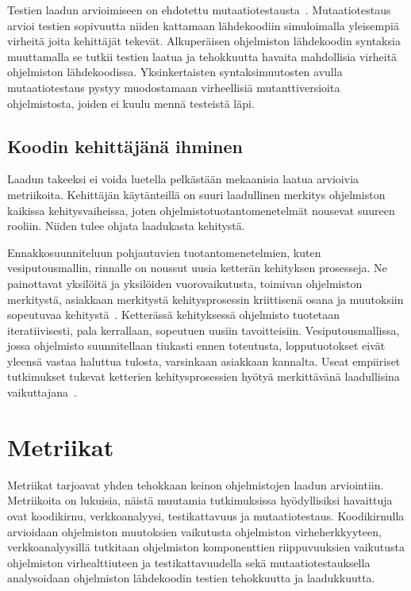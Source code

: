 \documentclass[finnish]{../tktltiki2}
\theoremstyle{definition}
\theoremstyle{remark}
\begin{document}
    Testien laadun arvioimiseen on ehdotettu mutaatiotestausta~\cite{YH11}. Mutaatiotestaus arvioi testien sopivuutta 
niiden kattamaan lähdekoodiin simuloimalla yleisempiä virheitä joita kehittäjät tekevät. Alkuperäisen ohjelmiston 
lähdekoodin syntaksia muuttamalla se tutkii testien laatua ja tehokkuutta havaita mahdollisia virheitä ohjelmiston 
lähdekoodissa. Yksinkertaisten syntaksimuutosten avulla mutaatiotestaus pystyy muodostamaan virheellisiä 
mutanttiversioita ohjelmistosta, joiden ei kuulu mennä testeistä läpi.

\subsection{Koodin kehittäjänä ihminen}

Laadun takeeksi ei voida luetella pelkästään mekaanisia laatua arvioivia metriikoita. Kehittäjän käytänteillä on suuri 
laadullinen merkitys ohjelmiston kaikissa kehitysvaiheissa, joten ohjelmistotuotantomenetelmät nousevat suureen rooliin. 
Niiden tulee ohjata laadukasta kehitystä.

    Ennakkosuunniteluun pohjautuvien tuotantomenetelmien, kuten vesiputousmallin, rinnalle on noussut uusia ketterän 
kehityksen prosesseja. Ne painottavat yksilöitä ja yksilöiden vuorovaikutusta, toimivan ohjelmiston merkitystä, 
asiakkaan merkitystä kehitysprosessin kriittisenä osana ja muutoksiin sopeutuvaa kehitystä~\cite{BBB01}. Ketterässä 
kehityksessä ohjelmisto tuotetaan iteratiivisesti, pala kerrallaan, sopeutuen uusiin tavoitteisiin. Vesiputousmallissa, 
jossa ohjelmisto suunnitellaan tiukasti ennen toteutusta, lopputuotokset eivät yleensä vastaa haluttua tulosta, 
varsinkaan asiakkaan kannalta. Useat empiiriset tutkimukset tukevat ketterien kehitysprosessien hyötyä merkittävänä 
laadullisina vaikuttajana~\cite{SS10}.

\section{Metriikat}

Metriikat tarjoavat yhden tehokkaan keinon ohjelmistojen laadun arviointiin. Metriikoita on lukuisia, näistä muutamia 
tutkimuksissa hyödyllisiksi havaittuja ovat koodikirnu, verkkoanalyysi, testikattavuus ja mutaatiotestaus. Koodikirnulla 
arvioidaan ohjelmiston muutoksien vaikutusta ohjelmiston virheherkkyyteen, verkkoanalyysillä tutkitaan ohjelmiston 
komponenttien riippuvuuksien vaikutusta ohjelmiston virhealttiuteen ja testikattavuudella sekä mutaatiotestauksella 
analysoidaan ohjelmiston lähdekoodin testien tehokkuutta ja laadukkuutta.
\end{document}
